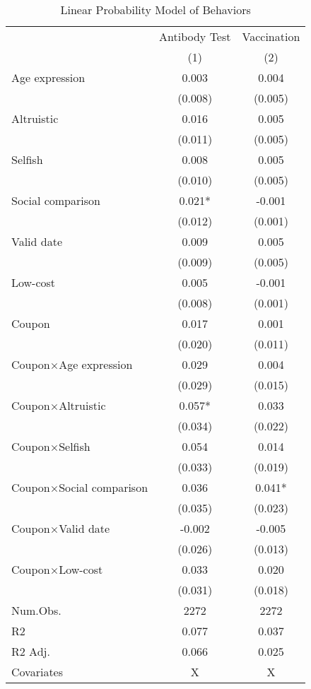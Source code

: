 \documentclass[
  11pt,
  a4paper,
]{article}
\begin{document}
\begin{table}

\caption{\label{tab:act-reg}Linear Probability Model of Behaviors}
\centering
\begin{tabular}[t]{lcc}
\toprule
\multicolumn{1}{c}{ } & \multicolumn{1}{c}{Antibody Test} & \multicolumn{1}{c}{Vaccination} \\
\cmidrule(l{3pt}r{3pt}){2-2} \cmidrule(l{3pt}r{3pt}){3-3}
  & (1) & (2)\\
\midrule
Age expression & 0.003 & 0.004\\
 & (0.008) & (0.005)\\
Altruistic & 0.016 & 0.005\\
 & (0.011) & (0.005)\\
Selfish & 0.008 & 0.005\\
 & (0.010) & (0.005)\\
Social comparison & 0.021* & -0.001\\
 & (0.012) & (0.001)\\
Valid date & 0.009 & 0.005\\
 & (0.009) & (0.005)\\
Low-cost & 0.005 & -0.001\\
 & (0.008) & (0.001)\\
Coupon & 0.017 & 0.001\\
 & (0.020) & (0.011)\\
Coupon×Age expression & 0.029 & 0.004\\
 & (0.029) & (0.015)\\
Coupon×Altruistic & 0.057* & 0.033\\
 & (0.034) & (0.022)\\
Coupon×Selfish & 0.054 & 0.014\\
 & (0.033) & (0.019)\\
Coupon×Social comparison & 0.036 & 0.041*\\
 & (0.035) & (0.023)\\
Coupon×Valid date & -0.002 & -0.005\\
 & (0.026) & (0.013)\\
Coupon×Low-cost & 0.033 & 0.020\\
 & (0.031) & (0.018)\\
\midrule
Num.Obs. & 2272 & 2272\\
R2 & 0.077 & 0.037\\
R2 Adj. & 0.066 & 0.025\\
Covariates & X & X\\
\bottomrule
\end{tabular}
\end{table}
\end{document}

